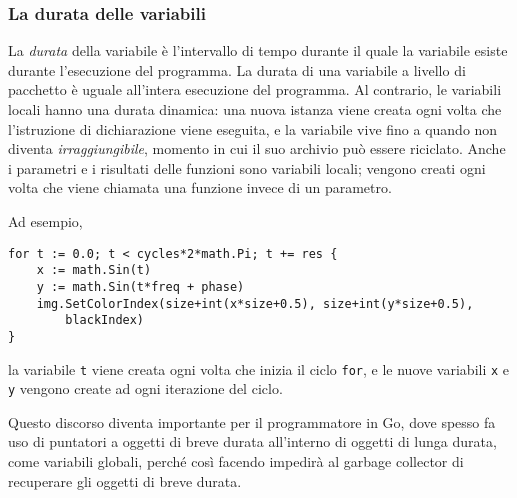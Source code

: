 \documentclass[../../../thesis.tex]{subfiles}
\begin{document}
    \subsubsection{La durata delle variabili}
    La \textit{durata} della variabile è l'intervallo di tempo durante il quale la variabile esiste durante l'esecuzione del programma.
    La durata di una variabile a livello di pacchetto è uguale all'intera esecuzione del programma.
    Al contrario, le variabili locali hanno una durata dinamica: una nuova istanza viene creata ogni volta che l'istruzione di dichiarazione viene eseguita, e la variabile vive fino a quando non diventa \textit{irraggiungibile}, momento in cui il suo archivio può essere riciclato.
    Anche i parametri e i risultati delle funzioni sono variabili locali;
    vengono creati ogni volta che viene chiamata una funzione invece di un parametro.
    \hfill \vspace{12pt}

    Ad esempio,
    \begin{lstlisting}[frame = single, label = {lst:lstlisting1-3-4.1}]
for t := 0.0; t < cycles*2*math.Pi; t += res {
    x := math.Sin(t)
    y := math.Sin(t*freq + phase)
    img.SetColorIndex(size+int(x*size+0.5), size+int(y*size+0.5),
        blackIndex)
}
    \end{lstlisting}
    la variabile \verb"t" viene creata ogni volta che inizia il ciclo \verb"for", e le nuove variabili \verb"x" e \verb"y" vengono create ad ogni iterazione del ciclo.
    \hfill \vspace{12pt}

    Questo discorso diventa importante per il programmatore in Go, dove spesso fa uso di puntatori a oggetti di breve durata all'interno di oggetti di lunga durata, come variabili globali, perché così facendo impedirà al garbage collector di recuperare gli oggetti di breve durata.
\end{document}
